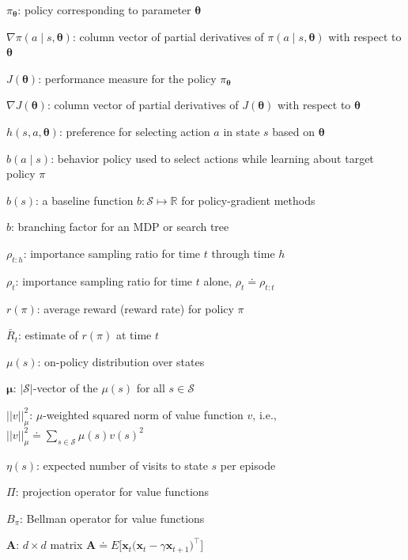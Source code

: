 \documentclass{article}
\begin{document}
$\pi _ { \boldsymbol{\theta} }$: policy corresponding to parameter $\boldsymbol{\theta}$

$\nabla \pi ( a \mid s , \boldsymbol { \theta } )$: column vector of partial derivatives of $\pi ( a \mid s , \boldsymbol { \theta } )$ with respect to $\boldsymbol { \theta }$

$J ( \boldsymbol { \theta } )$: performance measure for the policy $\pi _ { \boldsymbol{\theta} }$

$\nabla J ( \boldsymbol { \theta } )$: column vector of partial derivatives of $J ( \boldsymbol { \theta } )$ with respect to $\boldsymbol{\theta}$

$h ( s , a , \boldsymbol { \theta } )$: preference for selecting action $a$ in state $s$ based on $\boldsymbol{\theta}$

$b ( a \mid s )$: behavior policy used to select actions while learning about target policy $\pi$

$b ( s )$: a baseline function $b : \mathcal { S } \mapsto \mathbb { R }$ for policy-gradient methods

$b$: branching factor for an MDP or search tree

$\rho _ { t : h }$: importance sampling ratio for time $t$ through time $h$

$\rho _ { t }$: importance sampling ratio for time $t$ alone, $\rho _ { t } \doteq \rho _ { t : t }$ 

$r ( \pi )$: average reward (reward rate) for policy $\pi$

$\bar { R } _ { t }$: estimate of $r ( \pi )$ at time $t$

$\mu ( s )$: on-policy distribution over states

$\boldsymbol{\mu}$: $\vert \mathcal{S} \vert$-vector of the $\mu ( s )$ for all $s \in \mathcal { S }$

$\vert \vert v \vert \vert _ { \mu } ^ { 2 }$: $\mu$-weighted squared norm of value function $v$, i.e., $\vert \vert v \vert \vert _ { \mu } ^ { 2 } \doteq \sum _ { s \in \mathcal { S } } \mu ( s ) v ( s ) ^ { 2 }$

$\eta ( s )$: expected number of visits to state $s$ per episode

$\Pi$: projection operator for value functions

$B _ { \pi }$: Bellman operator for value functions

$\mathbf { A }$: $d \times d$ matrix $\mathbf { A } \doteq E \Big [ \mathbf { x } _ { t } \big ( \mathbf { x } _ { t } - \gamma \mathbf { x } _ { t + 1 } \big ) ^ { \top } \Big ]$
\end{document}
